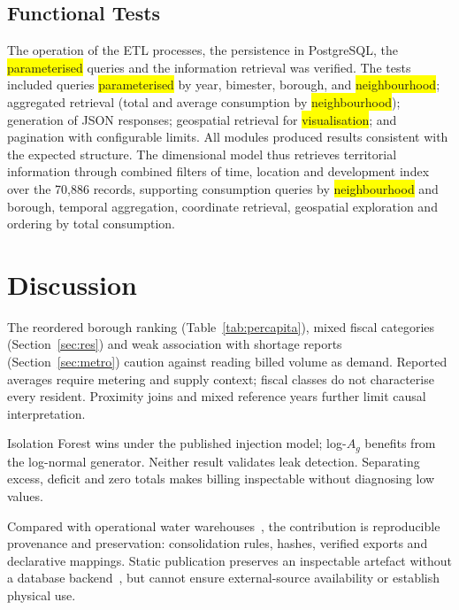 \documentclass[runningheads]{llncs}
\newif\ifmarcarcambios
\newcommand{\icokg}[1]{\ifmarcarcambios\textcolor{nuevo}{#1}\else#1\fi}
\newenvironment{icokgblock}{\ifmarcarcambios\color{nuevo}\fi}{}
\newcommand{\nuevo}[1]{\colorbox{yellow}{#1}}
\newenvironment{nuevobloque}{}{}
\renewcommand{\_}{\origunderscore\allowbreak}
\begin{document}
\subsection{Functional Tests}

\icokg{The operation of the ETL processes, the persistence in PostgreSQL, the \nuevo{parameterised} queries and the information retrieval was verified.} The tests included queries \nuevo{parameterised} by year, bimester, borough, and \nuevo{neighbourhood}; aggregated retrieval (total and average consumption by \nuevo{neighbourhood}); generation of JSON responses; geospatial retrieval for \nuevo{visualisation}; and pagination with configurable limits. All modules produced results consistent with the expected structure. The dimensional model thus retrieves territorial information through combined filters of time, location and development index over the 70,886 records, supporting consumption queries by \nuevo{neighbourhood} and borough, temporal aggregation, coordinate retrieval, geospatial exploration and ordering by total consumption.

\begin{icokgblock}
\section{Discussion}
\label{sec:disc}

\begin{nuevobloque}
The reordered borough ranking (Table~\ref{tab:percapita}), mixed fiscal categories
(Section~\ref{sec:res}) and weak association with shortage reports
(Section~\ref{sec:metro}) caution against reading billed volume as demand. Reported
averages require metering and supply context; fiscal classes do not characterise every
resident. Proximity joins and mixed reference years further limit causal interpretation.

Isolation Forest wins under the published injection model; log-$A_g$ benefits from the
log-normal generator. Neither result validates leak detection. Separating excess,
deficit and zero totals makes billing inspectable without diagnosing low values.

Compared with operational water warehouses~\cite{soares2019,abecker2014}, the contribution
is reproducible provenance and preservation: consolidation rules, hashes, verified
exports and declarative mappings. Static publication preserves an inspectable artefact
without a database backend~\cite{sandve2013,hill2023}, but cannot ensure external-source
availability or establish physical use.
\end{nuevobloque}
\end{icokgblock}
\end{document}
